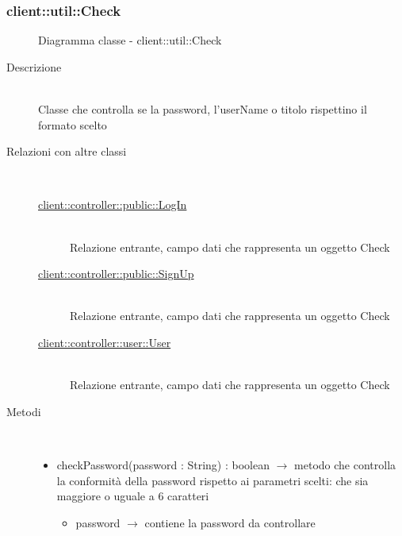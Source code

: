 \subsubsection[Check]{client::util::Check}
\begin{figure}[H]
	\centering
	\caption{Diagramma classe - client::util::Check}
\end{figure}\begin{description}
\item[Descrizione] \hfill \\
Classe che controlla se la password,  l'userName o titolo rispettino il formato scelto
\item[Relazioni con altre classi] \hfill \\
\vspace{-7mm}
\begin{description}
	\item[\hyperlink{client::controller::public::LogIn}{client::controller::public::LogIn}] \hfill \\
	Relazione entrante, campo dati che rappresenta un oggetto Check
	\item[\hyperlink{client::controller::public::SignUp}{client::controller::public::SignUp}] \hfill \\
	Relazione entrante, campo dati che rappresenta un oggetto Check
	\item[\hyperlink{client::controller::user::User}{client::controller::user::User}] \hfill \\
	Relazione entrante, campo dati che rappresenta un oggetto Check
\end{description}

\item[Metodi] \hfill \\
\vspace{-7mm}
\begin{itemize}
	\item checkPassword(password : String) : boolean $\rightarrow$ metodo che controlla la conformità della password rispetto ai parametri scelti: che sia maggiore o uguale a 6 caratteri\begin{itemize}
		\item password $\rightarrow$ contiene la password da controllare  
	\end{itemize}
	

\end{itemize}
\end{description}
